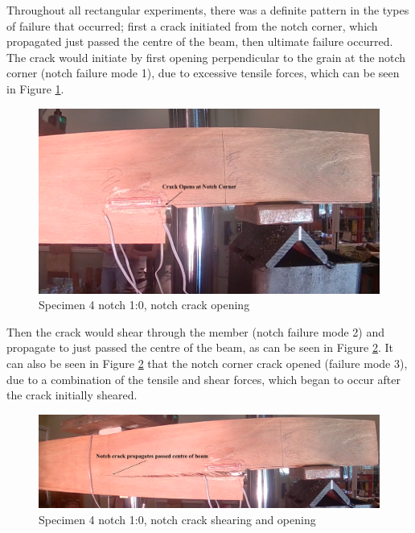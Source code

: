 \documentclass[11pt,a4paper]{article}
\numberwithin{equation}{subsection}
\begin{document}
\vspace*{\baselineskip}

\noindent
Throughout all rectangular experiments, there was a definite pattern in the types of failure that occurred; first a crack initiated from the notch corner, which propagated just passed the centre of the beam, then ultimate failure occurred. The crack would initiate by first opening perpendicular to the grain at the notch corner (notch failure mode 1), due to excessive tensile forces, which can be seen in Figure \ref{fig:Rect_Crack}. 

\begin{figure}[h]
	\begin{center}
		\includegraphics[scale=0.5]{Rect_Crack_Open}
	\end{center}
	\caption{Specimen 4 notch 1:0, notch crack opening}
	\label{fig:Rect_Crack}
\end{figure}
\pagebreak
\noindent
Then the crack would shear through the member (notch failure mode 2) and propagate to just passed the centre of the beam, as can be seen in Figure \ref{fig:Rect_Prop}. It can also be seen in Figure \ref{fig:Rect_Prop} that the notch corner crack opened (failure mode 3), due to a combination of the tensile and shear forces, which began to occur after the crack initially sheared.  

\begin{figure}[h]
	\begin{center}
		\includegraphics[scale=0.31]{Rect_propegate}
	\end{center}
	\caption{Specimen 4 notch 1:0, notch crack shearing and opening}
	\label{fig:Rect_Prop}
\end{figure}
\pagebreak
\end{document}

